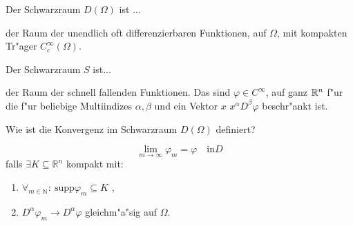 \documentclass[9pt]{article}
\newcommand{\Rn}{\mathbb{R}^n}
\newcommand{\R}[1]{%
	\ifthenelse{\equal{#1}{}}
		{\mathbb{R}}
		{\mathbb{R}^{#1}}}%
\newenvironment{field}{}{\newpage}
\newif\ifnote
\newenvironment{note}{\notetrue}{\notefalse}
\newcommand{\localtag}{}
\newcommand{\globaltag}{}
\newcommand{\uuid}{}
\newcommand{\tags}[1]{
    \ifnote 
        \renewcommand{\localtag}{#1}
    \else
        \renewcommand{\globaltag}{#1}
    \fi 
    }
\newcommand{\xplain}[1]{\renewcommand{\uuid}{#1}}
\begin{document}

\tags{mathe2::1sem::Distributionen}
	\begin{note}
		\xplain{209bf43d-23b8-4c25-a7f0-77f2ab721b9e}
		\tags{}
		
		\begin{field}  %
			Der Schwarzraum $D(\Omega)$ ist ...
		\end{field}
		
		\begin{field}  %
			der Raum der unendlich oft differenzierbaren Funktionen, auf $\Omega$, mit kompakten Tr"ager $C^\infty_c(\Omega)$.
		\end{field}
	\end{note}
		\begin{note}
			\xplain{31dae087-461c-4fb0-b899-69f8c9fba417}
			\tags{}
			
			\begin{field}  %
				Der Schwarzraum $S$ ist...
			\end{field}
			
			\begin{field}  %
				der Raum der schnell fallenden Funktionen. Das sind $\varphi \in C^\infty$, auf ganz $\R{n}$ f"ur die f"ur beliebige
				Multiindizes $\alpha, \beta$ und ein Vektor $x$ $x^\alpha D^\beta \varphi$ beschr"ankt ist.
			\end{field}
		\end{note}
		\begin{note}
			\xplain{d17d92bb-6f32-414a-85e2-ad05c8221605}
			\tags{}
			
			\begin{field}  %
				Wie ist die Konvergenz im Schwarzraum $D(\Omega)$  definiert?
			\end{field}
			
			\begin{field}  %
				\begin{equation*}
					\lim\limits_{m\rightarrow\infty} \varphi_m = \varphi \quad \text{in} D
				\end{equation*}
				falls $\exists K \subseteq \Rn$ kompakt mit:
				\begin{enumerate}
					\item $\forall_{m \in \mathbb{N}}: \ \text{supp}\varphi_m \subseteq K$ ,
					\item $D^\alpha\varphi_m \rightarrow D^\alpha\varphi$ gleichm"a"sig auf $\Omega$. 
				\end{enumerate}
			\end{field}
		\end{note}
\end{document}
